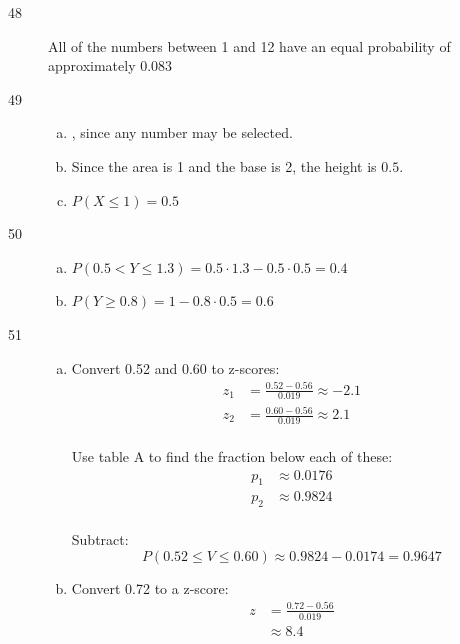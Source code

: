 \documentclass[letterpaper]{exam}
\begin{document}
\begin{description}
      \item[48]
        All of the numbers between 1 and 12 have an equal probability of
        approximately $\boxed{ 0.083 }$

      \item[49]
        \begin{enumerate}[(a)]
          \item {}, since any number may be selected.

          \item Since the area is 1 and the base is 2, the height is $\boxed{ 0.5 }$.

          \item $P(X \leq 1) = \boxed{ 0.5 }$

        \end{enumerate}  

      \item[50]
        \begin{enumerate}[(a)]
          \item $P(0.5 < Y \leq 1.3) = 0.5 \cdot 1.3 - 0.5 \cdot 0.5 = \boxed{ 0.4 }$
          \item $P(Y \geq 0.8) = 1 - 0.8 \cdot 0.5= \boxed{ 0.6 }$
        \end{enumerate}  

      \item[51]
        \begin{enumerate}[(a)]
          \item Convert 0.52 and 0.60 to z-scores:
            \begin{align*}
              z_1 & = \frac{0.52 - 0.56}{0.019} \approx -2.1 \\
              z_2 & = \frac{0.60 - 0.56}{0.019} \approx 2.1 \\
            \end{align*}

            Use table A to find the fraction below each of these:
            \begin{align*}
              p_1 &\approx 0.0176 \\
              p_2 &\approx 0.9824 \\
            \end{align*}

            Subtract:
            \[
              P(0.52 \leq V \leq 0.60) \approx 0.9824 - 0.0174 = \boxed{ 0.9647 }
            \]

          \item Convert 0.72 to a z-score:
            \begin{align*}
              z & = \frac{0.72 - 0.56}{0.019} \\
                & \approx 8.4 \\
            \end{align*}


\end{enumerate}
\end{description}
\end{document}

